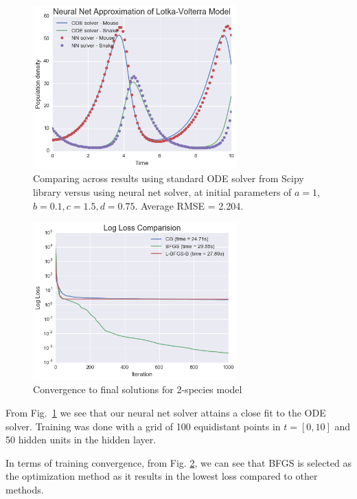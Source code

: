\documentclass[11pt]{article}
\begin{document}
\begin{figure}
\centering
\includegraphics[width=0.7\textwidth]{LV_Compare.png}
      \caption{Comparing across results using standard ODE solver from Scipy library versus using neural net solver, at initial parameters of $a = 1$, $b = 0.1, c = 1.5, d = 0.75$. Average RMSE = 2.204. \label{fig:LVFig}}
\end{figure}

\begin{figure}
\centering
\includegraphics[width=0.7\textwidth]{lossMethod_LV.png}
      \caption{Convergence to final solutions for 2-species model \label{fig:loss_LV2}}
\end{figure}

From Fig.~\ref{fig:LVFig} we see that our neural net solver attains a close fit to the ODE solver. Training was done with a grid of 100 equidistant points in $t = [0, 10]$ and 50 hidden units in the hidden layer. 

In terms of training convergence, from Fig. \ref{fig:loss_LV2}, we can see that BFGS is selected as the optimization method as it results in the lowest loss compared to other methods.
\end{document}
